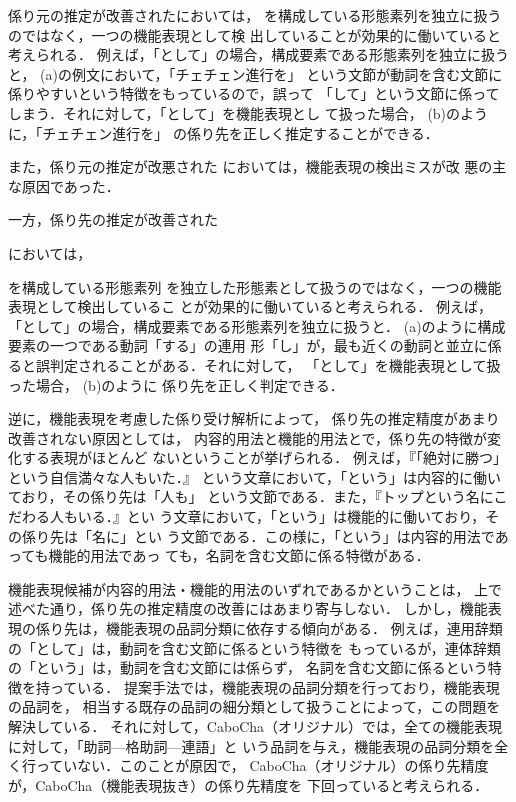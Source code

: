 \documentclass[japanese]{jnlp_1.3e}
\renewcommand{\underline}[1]{}
\begin{document}
係り元の推定が改善された\underline{事例}においては，
\underline{機能表現}を構成している形態素列を独立に扱うのではなく，一つの機能表現として検
出していることが効果的に働いていると考えられる．
例えば，「として」の場合，構成要素である形態素列を独立に扱うと，
 (a)の例文において，「チェチェン進行を」
という文節が動詞を含む文節に係りやすいという特徴をもっているので，誤って
「して」という文節に係ってしまう．それに対して，「として」を機能表現とし
て扱った場合， (b)のように，「チェチェン進行を」
の係り先を正しく推定することができる．

また，係り元の推定が改悪された
\underline{事例}においては，機能表現の検出ミスが改
悪の主な原因であった．

一方，係り先の推定が改善された
\underline{事例}
においては，
\underline{機能表現}
を構成している形態素列
を独立した形態素として扱うのではなく，一つの機能表現として検出しているこ
とが効果的に働いていると考えられる．
例えば，「として」の場合，構成要素である形態素列を独立に扱うと．
 (a)のように構成要素の一つである動詞「する」の連用
形「し」が，最も近くの動詞と並立に係ると誤判定されることがある．それに対して，
「として」を機能表現として扱った場合， (b)のように
係り先を正しく判定できる．


逆に，機能表現を考慮した係り受け解析によって，
係り先の推定精度があまり改善されない原因としては，
内容的用法と機能的用法とで，係り先の特徴が変化する表現がほとんど
ないということが挙げられる．
例えば，『「絶対に勝つ」という自信満々な人もいた．』
という文章において，「という」は内容的に働いており，その係り先は「人も」
という文節である．また，『トップという名にこだわる人もいる．』とい
う文章において，「という」は機能的に働いており，その係り先は「名に」とい
う文節である．この様に，「という」は内容的用法であっても機能的用法であっ
ても，名詞を含む文節に係る特徴がある．

機能表現候補が内容的用法・機能的用法のいずれであるかということは，
上で述べた通り，係り先の推定精度の改善にはあまり寄与しない．
しかし，機能表現の係り先は，機能表現の品詞分類に依存する傾向がある．
例えば，連用辞類の「として」は，動詞を含む文節に係るという特徴を
もっているが，連体辞類の「という」は，動詞を含む文節には係らず，
名詞を含む文節に係るという特徴を持っている．
提案手法では，機能表現の品詞分類を行っており，機能表現の品詞を，
相当する既存の品詞の細分類として扱うことによって，この問題を解決している．
それに対して，CaboCha（オリジナル）では，全ての機能表現に対して，「助詞—格助詞—連語」と
いう品詞を与え，機能表現の品詞分類を全く行っていない．このことが原因で，
CaboCha（オリジナル）の係り先精度が，CaboCha（機能表現抜き）の係り先精度を
下回っていると考えられる．
\end{document}
